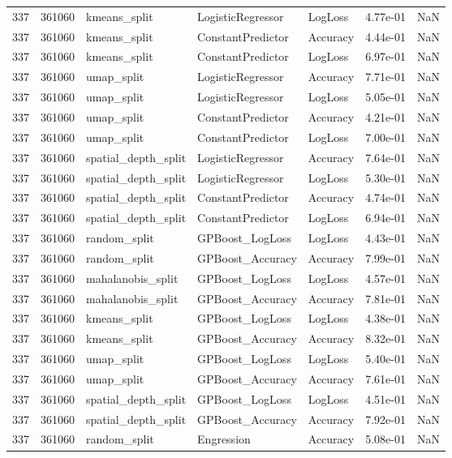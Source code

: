 \begin{tabular}{rrlllrr}
337 & 361060 & kmeans\_split & LogisticRegressor & LogLoss & 4.77e-01 & NaN \\
337 & 361060 & kmeans\_split & ConstantPredictor & Accuracy & 4.44e-01 & NaN \\
337 & 361060 & kmeans\_split & ConstantPredictor & LogLoss & 6.97e-01 & NaN \\
337 & 361060 & umap\_split & LogisticRegressor & Accuracy & 7.71e-01 & NaN \\
337 & 361060 & umap\_split & LogisticRegressor & LogLoss & 5.05e-01 & NaN \\
337 & 361060 & umap\_split & ConstantPredictor & Accuracy & 4.21e-01 & NaN \\
337 & 361060 & umap\_split & ConstantPredictor & LogLoss & 7.00e-01 & NaN \\
337 & 361060 & spatial\_depth\_split & LogisticRegressor & Accuracy & 7.64e-01 & NaN \\
337 & 361060 & spatial\_depth\_split & LogisticRegressor & LogLoss & 5.30e-01 & NaN \\
337 & 361060 & spatial\_depth\_split & ConstantPredictor & Accuracy & 4.74e-01 & NaN \\
337 & 361060 & spatial\_depth\_split & ConstantPredictor & LogLoss & 6.94e-01 & NaN \\
337 & 361060 & random\_split & GPBoost\_LogLoss & LogLoss & 4.43e-01 & NaN \\
337 & 361060 & random\_split & GPBoost\_Accuracy & Accuracy & 7.99e-01 & NaN \\
337 & 361060 & mahalanobis\_split & GPBoost\_LogLoss & LogLoss & 4.57e-01 & NaN \\
337 & 361060 & mahalanobis\_split & GPBoost\_Accuracy & Accuracy & 7.81e-01 & NaN \\
337 & 361060 & kmeans\_split & GPBoost\_LogLoss & LogLoss & 4.38e-01 & NaN \\
337 & 361060 & kmeans\_split & GPBoost\_Accuracy & Accuracy & 8.32e-01 & NaN \\
337 & 361060 & umap\_split & GPBoost\_LogLoss & LogLoss & 5.40e-01 & NaN \\
337 & 361060 & umap\_split & GPBoost\_Accuracy & Accuracy & 7.61e-01 & NaN \\
337 & 361060 & spatial\_depth\_split & GPBoost\_LogLoss & LogLoss & 4.51e-01 & NaN \\
337 & 361060 & spatial\_depth\_split & GPBoost\_Accuracy & Accuracy & 7.92e-01 & NaN \\
337 & 361060 & random\_split & Engression & Accuracy & 5.08e-01 & NaN \\

\end{tabular}
